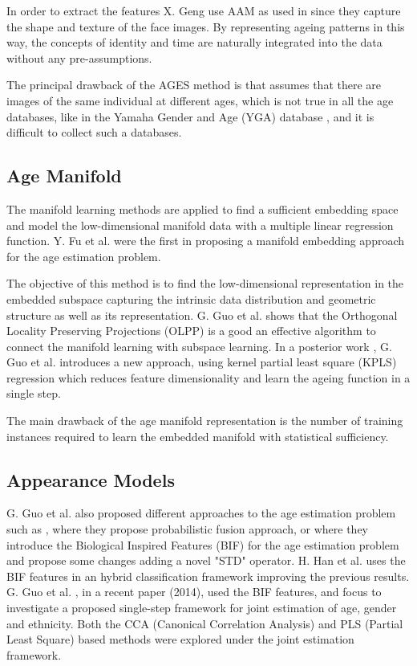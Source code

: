 In order to extract the features X. Geng use AAM as used in \cite{791208} since they capture the shape and texture of the face images. By representing ageing patterns in this way, the concepts of identity and time are naturally integrated into the data without any pre-assumptions.

The principal drawback of the AGES method is that assumes that there are images of the same individual at different ages, which is not true in all the age databases, like in the Yamaha Gender and Age (YGA) database \cite{4523958}, and it is difficult to collect such a databases.

\subsection{Age Manifold}
 
The manifold learning methods are applied to find a sufficient embedding space and model the low-dimensional manifold data with a multiple linear regression function. Y. Fu et al. \cite{4523958, 4284917} were the first in proposing a manifold embedding approach for the age estimation problem. 

The objective of this method is to find the low-dimensional representation in the embedded subspace capturing the intrinsic data distribution and geometric structure as well as its representation. G. Guo et al. \cite{Guo:2008:IHA:2319085.2321608} \cite{4531189} shows that the Orthogonal Locality Preserving Projections (OLPP) \cite{CHHZ06}  is a good an effective algorithm  to connect the manifold learning with subspace learning. In a posterior work \cite{5995404}, G. Guo et al. introduces a new approach, using kernel partial least square (KPLS) regression which reduces feature dimensionality and learn the ageing function in a single step.

The main drawback of the age manifold representation is the number of training instances required to learn the embedded manifold with statistical sufficiency.

\subsection{Appearance Models}

G. Guo et al. also proposed different approaches to the age estimation problem such as
\cite{4563041}, where they propose probabilistic fusion approach, or \cite{conf/cvpr/GuoMFH09} where they introduce the Biological Inspired Features (BIF) for the age estimation problem and propose some changes adding a novel "STD" operator. H. Han et al. \cite{han:age} uses the BIF features in an hybrid classification framework improving the previous results. G. Guo et al. \cite{Guo2014761}, in a recent paper (2014), used the BIF features, and focus to investigate a proposed single-step framework for joint estimation of age, gender and ethnicity. Both the CCA (Canonical Correlation Analysis) and PLS (Partial Least Square) based methods were explored under the joint estimation framework.

